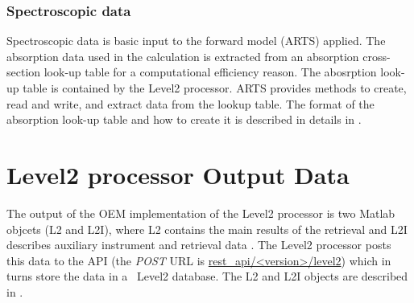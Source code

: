 \subsubsection{Spectroscopic data}

Spectroscopic data is basic input to the forward model (ARTS) applied.
The absorption data used in the calculation is extracted 
from an absorption cross-section look-up table for a computational efficiency reason.
The abosrption look-up table is contained by the Level2 processor.
ARTS provides methods to create, read and write, and 
extract data from the lookup table.
The format of the absorption look-up table and how to create it
is described in details in \citet{artsug}.


\section{Level2 processor Output Data}

The output of the OEM implementation of the Level2 processor is
two Matlab objcets (L2 and L2I), where L2 contains
the main results of the retrieval and L2I describes
auxiliary instrument and retrieval data \citep{atbdl2}.
The Level2 processor posts this data to the API
(the \emph{POST} URL is \url{rest_api/<version>/level2})
which in turns store the data in a \smr\ Level2 database.
The L2 and L2I objects are described in \cite{l2data}.
